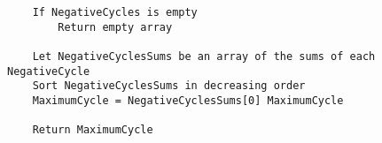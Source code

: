 \documentclass[12pt]{article}
\begin{document}
\begin{enumerate}[(a)]
\begin{addmargin}[2em]{2em}
\begin{lstlisting}
	If NegativeCycles is empty
		Return empty array

	Let NegativeCyclesSums be an array of the sums of each NegativeCycle
	Sort NegativeCyclesSums in decreasing order
	MaximumCycle = NegativeCyclesSums[0] MaximumCycle

	Return MaximumCycle
\end{lstlisting}
\end{addmargin}
\end{enumerate}
\end{document}
